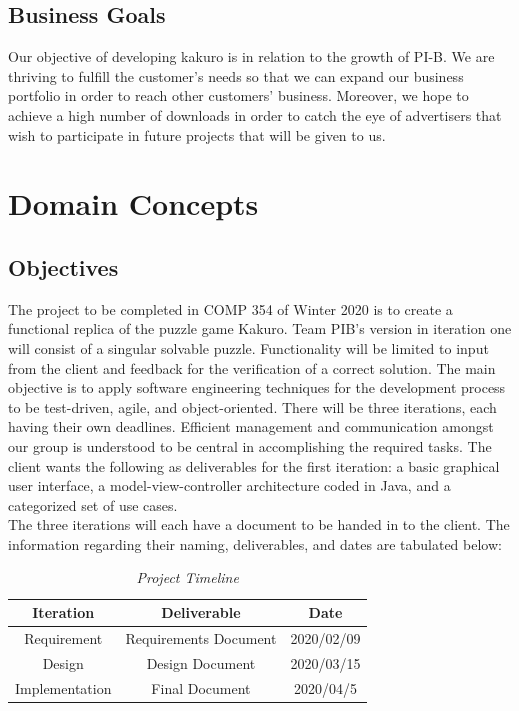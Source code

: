 \documentclass[12pt]{article}
\begin{document}
\subsection{Business Goals}

\hspace{\parindent} Our objective of developing kakuro is in relation to the growth of PI-B. We are thriving to fulfill the customer’s needs so that we can expand our business portfolio in order to reach other customers’ business. Moreover, we hope to achieve a high number of downloads in order to catch the eye of advertisers that wish to participate in future projects that will be given to us.

\clearpage

\clearpage

\section{Domain Concepts}
\subsection{Objectives}

The project to be completed in COMP 354 of Winter 2020 is to create a functional replica of the puzzle game Kakuro. Team PIB's version in iteration one will consist of a singular solvable puzzle. Functionality will be limited to input from the client and feedback for the verification of a correct solution. The main objective is to apply software engineering techniques for the development process to be test-driven, agile, and object-oriented. There will be three iterations, each having their own deadlines. Efficient management and communication amongst our group is understood to be central in accomplishing the required tasks. The client wants the following as deliverables for the first iteration: a basic graphical user interface, a model-view-controller architecture coded in Java, and a categorized set of use cases.\\  
The three iterations will each have a document to be handed in to the client. The information regarding their naming, deliverables, and dates are tabulated below:\\

\begin{table}[htbp]
\begin{center}
\begin{tabular}{| c | c | c |}
\hline
\cellcolor{gray}Iteration & \cellcolor{gray}Deliverable & \cellcolor{gray} Date \\
\hline
Requirement & Requirements Document & 2020/02/09 \\
\hline
Design & Design Document & 2020/03/15 \\
\hline
Implementation & Final Document & 2020/04/5 \\
\hline
\end{tabular}
\caption*{\textit {Project Timeline}}
\end{center}
\end{table}
\end{document}
